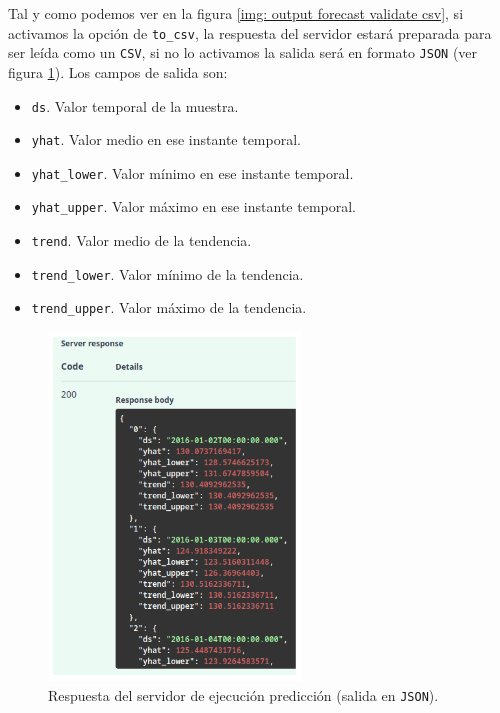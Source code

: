 \documentclass[a4paper, oneside, 12pt]{book}
\begin{document}
	\pagebreak
	
	\noindent Tal y como podemos ver en la figura \ref{img: output forecast validate csv}, si activamos la opción de \texttt{to\_csv}, la respuesta del servidor estará preparada para ser leída como un \texttt{CSV}, si no lo activamos la salida será en formato \texttt{JSON} (ver figura \ref{img: output forecast validate json}). Los campos de salida son:
	
	\begin{itemize}
		\item \texttt{ds}. Valor temporal de la muestra.
		\item \texttt{yhat}. Valor medio en ese instante temporal.
		\item \texttt{yhat\_lower}. Valor mínimo en ese instante temporal.
		\item \texttt{yhat\_upper}. Valor máximo en ese instante temporal.
		\item \texttt{trend}. Valor medio de la tendencia.
		\item \texttt{trend\_lower}. Valor mínimo de la tendencia.
		\item \texttt{trend\_upper}. Valor máximo de la tendencia.
	\end{itemize}

	\begin{figure}[h!]
		\begin{center}
			\includegraphics[width=0.6\textwidth]{diag/output_forecast_validate_json.png}
			\caption{Respuesta del servidor de ejecución predicción (salida en \texttt{JSON}).}
			\label{img: output forecast validate json}
		\end{center}
	\end{figure}
	
\end{document}
